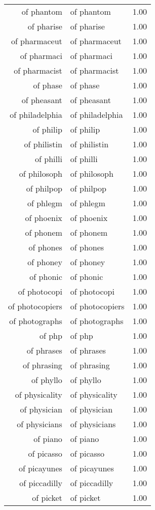 \begin{table}[ht]
\begin{tabular}{rlr}
  of phantom & of phantom & 1.00 \\ 
  of pharise & of pharise & 1.00 \\ 
  of pharmaceut & of pharmaceut & 1.00 \\ 
  of pharmaci & of pharmaci & 1.00 \\ 
  of pharmacist & of pharmacist & 1.00 \\ 
  of phase & of phase & 1.00 \\ 
  of pheasant & of pheasant & 1.00 \\ 
  of philadelphia & of philadelphia & 1.00 \\ 
  of philip & of philip & 1.00 \\ 
  of philistin & of philistin & 1.00 \\ 
  of philli & of philli & 1.00 \\ 
  of philosoph & of philosoph & 1.00 \\ 
  of philpop & of philpop & 1.00 \\ 
  of phlegm & of phlegm & 1.00 \\ 
  of phoenix & of phoenix & 1.00 \\ 
  of phonem & of phonem & 1.00 \\ 
  of phones & of phones & 1.00 \\ 
  of phoney & of phoney & 1.00 \\ 
  of phonic & of phonic & 1.00 \\ 
  of photocopi & of photocopi & 1.00 \\ 
  of photocopiers & of photocopiers & 1.00 \\ 
  of photographs & of photographs & 1.00 \\ 
  of php & of php & 1.00 \\ 
  of phrases & of phrases & 1.00 \\ 
  of phrasing & of phrasing & 1.00 \\ 
  of phyllo & of phyllo & 1.00 \\ 
  of physicality & of physicality & 1.00 \\ 
  of physician & of physician & 1.00 \\ 
  of physicians & of physicians & 1.00 \\ 
  of piano & of piano & 1.00 \\ 
  of picasso & of picasso & 1.00 \\ 
  of picayunes & of picayunes & 1.00 \\ 
  of piccadilly & of piccadilly & 1.00 \\ 
  of picket & of picket & 1.00 \\ 

\end{tabular}
\end{table}
